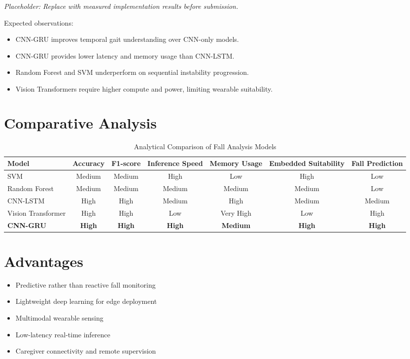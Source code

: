 \documentclass[conference]{IEEEtran}
\begin{document}
\textit{Placeholder: Replace with measured implementation results before submission.}

Expected observations:
\begin{itemize}[leftmargin=*]
\item CNN-GRU improves temporal gait understanding over CNN-only models.
\item CNN-GRU provides lower latency and memory usage than CNN-LSTM.
\item Random Forest and SVM underperform on sequential instability progression.
\item Vision Transformers require higher compute and power, limiting wearable suitability.
\end{itemize}

\section{Comparative Analysis}
\begin{table}[!t]
\centering
\caption{Analytical Comparison of Fall Analysis Models}
\label{tab:comparison}
\scriptsize
\begin{tabular}{lcccccc}
\toprule
Model & Accuracy & F1-score & Inference Speed & Memory Usage & Embedded Suitability & Fall Prediction \\
\midrule
SVM & Medium & Medium & High & Low & High & Low \\
Random Forest & Medium & Medium & Medium & Medium & Medium & Low \\
CNN-LSTM & High & High & Medium & High & Medium & Medium \\
Vision Transformer & High & High & Low & Very High & Low & High \\
\textbf{CNN-GRU} & \textbf{High} & \textbf{High} & \textbf{High} & \textbf{Medium} & \textbf{High} & \textbf{High} \\
\bottomrule
\end{tabular}
\end{table}

\section{Advantages}
\begin{itemize}[leftmargin=*]
\item Predictive rather than reactive fall monitoring
\item Lightweight deep learning for edge deployment
\item Multimodal wearable sensing
\item Low-latency real-time inference
\item Caregiver connectivity and remote supervision
\end{itemize}
\end{document}
